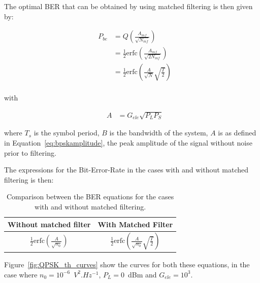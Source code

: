 The optimal BER that can be obtained by using matched filtering is then given by:

\begin{eqnarray}\label{eq:berBPSK}
&P_{be} &= Q\left({\frac{A_{mf}}{\sqrt{N_{mf}}}}\right)\nonumber\\
&		&= \frac{1}{2} \text{erfc}\left({\frac{A_{mf}}{\sqrt{2 N_{mf}}}}\right)\nonumber\\
&	    &= \frac{1}{2} \text{erfc}\left({\frac{A}{\sqrt{N}}\sqrt{\frac{T}{2}}}\right)\\
\end{eqnarray}

with

\begin{eqnarray}
&A &= G_{ele} \sqrt{P_L P_S}
\end{eqnarray}


\noindent where $T_s$ is the symbol period, $B$ is the bandwidth of the system, $A$ is as defined in Equation~\ref{eq:bpskamplitude}, the peak amplitude of the signal without noise prior to filtering.

The expressions for the Bit-Error-Rate in the cases with and without matched filtering is then:

\begin{table}[H]
	\centering
	\begin{tabulary}{1.0\textwidth}{|c|c|}
		\hline
		\textbf{Without matched filter} 								& \textbf{With Matched Filter} \\ \hline
		$ \frac{1}{2} \text{erfc} \left( \frac{A}{\sqrt{n_0}} \right) $	& $ \frac{1}{2} \text{erfc} \left( \frac{A}{\sqrt{n_0}} \sqrt{\frac{T}{2}} \right) $ \\ \hline
	\end{tabulary}
	
	\caption{Comparison between the BER equations for the cases with and without matched filtering.\label{tab:ber_qpsk}}
\end{table}

Figure~\ref{fig:QPSK_th_curves} show the curves for both these equations, in the case where  $n_0=10^{-6}$~$V^2.Hz^{-1}$, $P_L = 0$~dBm and $G_{ele} = 10^3$.


